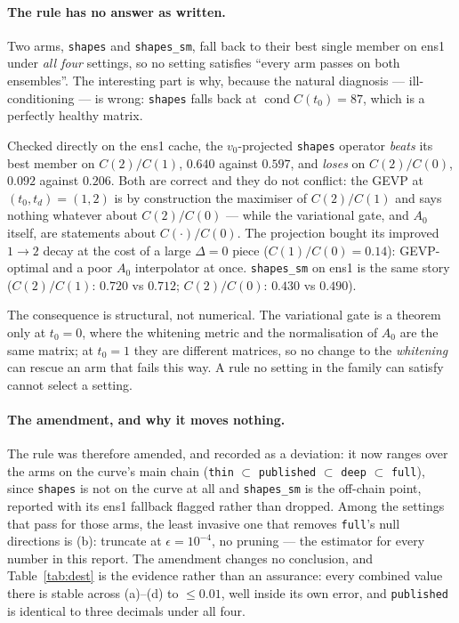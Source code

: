 \documentclass[11pt,a4paper]{article}
\newcommand{\Azero}{A_0}
\newcommand{\arm}[1]{\texttt{#1}}
\begin{document}
\paragraph{The rule has no answer as written.} Two arms, \arm{shapes} and
\arm{shapes\_sm}, fall back to their best single member on ens1 under
\emph{all four} settings, so no setting satisfies ``every arm passes on both
ensembles''. The interesting part is why, because the natural diagnosis ---
ill-conditioning --- is wrong: \arm{shapes} falls back at
$\operatorname{cond} C(t_0) = 87$, which is a perfectly healthy matrix.

Checked directly on the ens1 cache, the $v_0$-projected \arm{shapes} operator
\emph{beats} its best member on $C(2)/C(1)$, $0.640$ against $0.597$, and
\emph{loses} on $C(2)/C(0)$, $0.092$ against $0.206$. Both are correct and they
do not conflict: the GEVP at $(t_0,t_d) = (1,2)$ is by construction the
maximiser of $C(2)/C(1)$ and says nothing whatever about $C(2)/C(0)$ --- while
the variational gate, and $\Azero$ itself, are statements about
$C(\cdot)/C(0)$. The projection bought its improved $1\to2$ decay at the cost of
a large $\Delta=0$ piece ($C(1)/C(0) = 0.14$): GEVP-optimal and a poor $\Azero$
interpolator at once. \arm{shapes\_sm} on ens1 is the same story
($C(2)/C(1)$: $0.720$ vs $0.712$; $C(2)/C(0)$: $0.430$ vs $0.490$).

The consequence is structural, not numerical. The variational gate is a theorem
only at $t_0 = 0$, where the whitening metric and the normalisation of $\Azero$
are the same matrix; at $t_0 = 1$ they are different matrices, so no change to
the \emph{whitening} can rescue an arm that fails this way. A rule no setting in
the family can satisfy cannot select a setting.

\paragraph{The amendment, and why it moves nothing.} The rule was therefore
amended, and recorded as a deviation: it now ranges over the arms on the curve's
main chain (\arm{thin} $\subset$ \arm{published} $\subset$ \arm{deep} $\subset$
\arm{full}), since \arm{shapes} is not on the curve at all and
\arm{shapes\_sm} is the off-chain point, reported with its ens1 fallback flagged
rather than dropped. Among the settings that pass for those arms, the least
invasive one that removes \arm{full}'s null directions is (b): truncate at
$\epsilon = 10^{-4}$, no pruning --- the estimator for every number in this
report. The amendment changes no conclusion, and Table~\ref{tab:dest} is the
evidence rather than an assurance: every combined value there is stable across
(a)--(d) to $\le 0.01$, well inside its own error, and \arm{published} is
identical to three decimals under all four.
\end{document}
